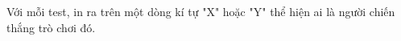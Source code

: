 Với mỗi test, in ra trên một dòng kí tự "X" hoặc "Y" thể hiện ai là người chiến thắng trò chơi đó.

\
